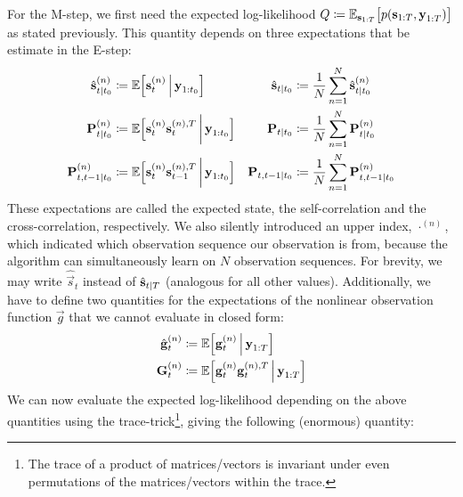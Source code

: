 	For the M-step, we first need the expected log-likelihood \( Q \coloneqq \mathbb{E}_{\boldsymbol{\mathrm{s}}_{1:T}}\big[ p(\boldsymbol{\mathrm{s}}_{1:T}, \boldsymbol{\mathrm{y}}_{1:T}) \big] \) as stated previously. This quantity depends on three expectations that be estimate in the E-step:
	\begin{align*}
		\hat{\boldsymbol{\mathrm{s}}}_{t \vert t_0}^{(n)}  & \coloneqq \mathbb{E}\Big[\boldsymbol{\mathrm{s}}_t^{(n)} \,\Big\vert\, \boldsymbol{\mathrm{y}}_{1:t_0}\Big]                             & \hat{\boldsymbol{\mathrm{s}}}_{t \vert t_0}           & \coloneqq \frac{1}{N} \sum_{n = 1}^{N} \hat{\boldsymbol{\mathrm{s}}}_{t \vert t_0}^{(n)}  \\
		\boldsymbol{\mathrm{P}}_{t \vert t_0}^{(n)}        & \coloneqq \mathbb{E}\Big[\boldsymbol{\mathrm{s}}_t^{(n)} \boldsymbol{\mathrm{s}}_t^{(n), T} \,\bigg\vert\, \boldsymbol{\mathrm{y}}_{1:t_0}\Big]       & \boldsymbol{\mathrm{P}}_{t \vert t_0}        & \coloneqq \frac{1}{N} \sum_{n = 1}^{N} \boldsymbol{\mathrm{P}}_{t \vert t_0}^{(n)}        \\
		\boldsymbol{\mathrm{P}}_{t, t - 1 \vert t_0}^{(n)} & \coloneqq \mathbb{E}\Big[\boldsymbol{\mathrm{s}}_t^{(n)} \boldsymbol{\mathrm{s}}_{t - 1}^{(n), T} \,\bigg\vert\, \boldsymbol{\mathrm{y}}_{1:t_0}\Big] & \boldsymbol{\mathrm{P}}_{t, t - 1 \vert t_0} & \coloneqq \frac{1}{N} \sum_{n = 1}^{N} \boldsymbol{\mathrm{P}}_{t, t - 1 \vert t_0}^{(n)}
	\end{align*}
	These expectations are called the expected state, the self-correlation and the cross-correlation, respectively. We also silently introduced an upper index, \( \cdot^{(n)} \), which indicated which observation sequence our observation is from, because the algorithm can simultaneously learn on \(N\) observation sequences. For brevity, we may write \( \hat{\vec{s}}_t \) instead of \( \hat{\boldsymbol{\mathrm{s}}}_{t \vert T} \) (analogous for all other values). Additionally, we have to define two quantities for the expectations of the nonlinear observation function \( \vec{g} \) that we cannot evaluate in closed form:
	\begin{align*}
		\hat{\boldsymbol{\mathrm{g}}}_t^{(n)} &\coloneqq \mathbb{E}\Big[\boldsymbol{\mathrm{g}}_t^{(n)} \,\Big\vert\, \boldsymbol{\mathrm{y}}_{1:T}\Big] \\
		\boldsymbol{\mathrm{G}}_t^{(n)}       &\coloneqq \mathbb{E}\Big[\boldsymbol{\mathrm{g}}_t^{(n)} \boldsymbol{\mathrm{g}}_t^{(n), T} \,\Big\vert\, \boldsymbol{\mathrm{y}}_{1:T}\Big]
	\end{align*}
	We can now evaluate the expected log-likelihood depending on the above quantities using the trace-trick\footnote{The trace of a product of matrices/vectors is invariant under even permutations of the matrices/vectors within the trace.}, giving the following (enormous) quantity:
